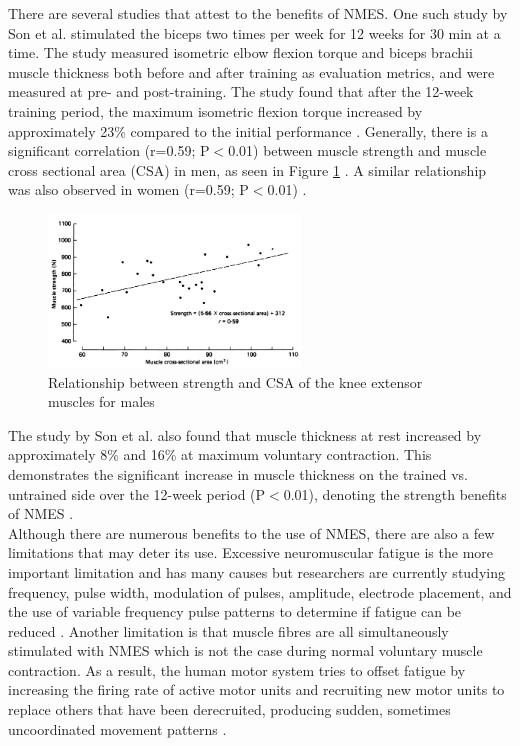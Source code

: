 \documentclass[11.5pt]{article}
\begin{document}
There are several studies that attest to the benefits of NMES. One such study by Son et al. stimulated the biceps two times per week for 12 weeks for 30 min at a time. The study measured isometric elbow flexion torque and biceps brachii muscle thickness both before and after training as evaluation metrics, and were measured at pre- and post-training. The study found that after the 12-week training period, the maximum isometric flexion torque increased by approximately 23\% compared to the initial performance \cite{Rohan}. Generally, there is a significant correlation (r=0.59; P$<$0.01) between muscle strength and muscle cross sectional area (CSA) in men, as seen in Figure \ref{fig:strvscsa} \cite{Maughan}. A similar relationship was also observed in women (r=0.59; P$<$0.01) \cite{Maughan}.

\begin{figure}[H]
    \centering
    \includegraphics[width=0.6\textwidth]{litreview/csavsstr.png}
    \caption{Relationship between strength and CSA of the knee extensor muscles for males \cite{Maughan}}
    \label{fig:strvscsa}
\end{figure}

The study by Son et al. also found that muscle thickness at rest increased by approximately 8\% and 16\% at maximum voluntary contraction. This demonstrates the significant increase in muscle thickness on the trained vs. untrained side over the 12-week period (P$<$0.01), denoting the strength benefits of NMES \cite{Son}.\\

Although there are numerous benefits to the use of NMES, there are also a few limitations that may deter its use. Excessive neuromuscular fatigue is the more important limitation and has many causes but researchers are currently studying frequency, pulse width, modulation of pulses, amplitude, electrode placement, and the use of variable frequency pulse patterns to determine if fatigue can be reduced \cite{Doucet}. Another limitation is that muscle fibres are all simultaneously stimulated with NMES which is not the case during normal voluntary muscle contraction. As a result, the human motor system tries to offset fatigue by increasing the firing rate of active motor units and recruiting new motor units to replace others that have been derecruited, producing sudden, sometimes uncoordinated movement patterns \cite{Doucet}.\\
\end{document}
